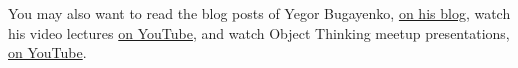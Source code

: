 \documentclass[nobrand,anonymous,nodate,nosecurity]{huawei}
\begin{document}
\newpage
\renewcommand\refname{Learning Materials}
\printbibliography

You may also want to read the blog posts of Yegor Bugayenko, \href{https://www.yegor256.com/tag/oop}{on his blog}, watch his video lectures \href{https://www.youtube.com/playlist?list=PLaIsQH4uc08yw2CsNv5OV30GfKE6XVGii}{on YouTube}, and watch Object Thinking meetup presentations, \href{https://www.youtube.com/watch?v=yT6oO28wEik&list=PLaIsQH4uc08yetzX86w1pPck1QtGEy_ik}{on YouTube}.
\end{document}
